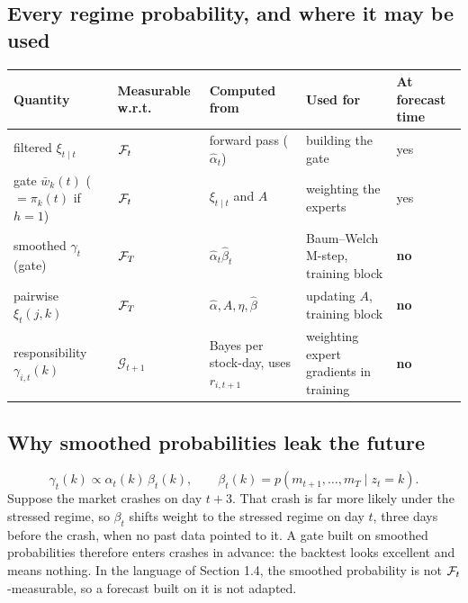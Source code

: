 \subsection{Every regime probability, and where it may be used}
\begin{center}
\small\renewcommand{\arraystretch}{1.3}
\begin{tabularx}{\textwidth}{@{}p{2.6cm}p{1.6cm}p{2.6cm}Xp{1.4cm}@{}}
\toprule
Quantity & Measurable w.r.t. & Computed from & Used for & At forecast time \\
\midrule
filtered $\xi_{t\mid t}$ & $\mathcal{F}_t$ & forward pass ($\hat\alpha_t$) & building the gate & yes \\
gate $\bar w_k(t)$ ($=\pi_k(t)$ if $h=1$) & $\mathcal{F}_t$ & $\xi_{t\mid t}$ and $A$ & weighting the experts & yes \\
smoothed $\gamma_t$ (gate) & $\mathcal{F}_T$ & $\hat\alpha_t\hat\beta_t$ & Baum--Welch M-step, training block & \textbf{no} \\
pairwise $\xi_t(j,k)$ & $\mathcal{F}_T$ & $\hat\alpha,A,\eta,\hat\beta$ & updating $A$, training block & \textbf{no} \\
responsibility $\gamma_{i,t}(k)$ & $\mathcal G_{t+1}$ & Bayes per stock-day, uses $r_{i,t+1}$ & weighting expert gradients in training & \textbf{no} \\
\bottomrule
\end{tabularx}
\end{center}

\subsection{Why smoothed probabilities leak the future}
\begin{equation}
\gamma_t(k)\propto\alpha_t(k)\,\beta_t(k),\qquad\beta_t(k)=p(m_{t+1},\dots,m_T\mid z_t=k).
\end{equation}
Suppose the market crashes on day $t+3$. That crash is far more likely under the stressed regime, so $\beta_t$ shifts weight to the stressed regime on day $t$, three days before the crash, when no past data pointed to it. A gate built on smoothed probabilities therefore enters crashes in advance: the backtest looks excellent and means nothing. In the language of Section 1.4, the smoothed probability is not $\mathcal{F}_t$-measurable, so a forecast built on it is not adapted.


